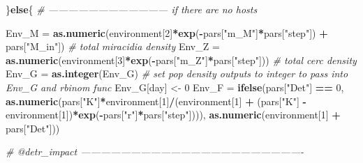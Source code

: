 \documentclass[10,portrait]{article}
\newenvironment{Shaded}{\begin{snugshade}}{\end{snugshade}}
\newcommand{\KeywordTok}[1]{\textcolor[rgb]{0.13,0.29,0.53}{\textbf{#1}}}
\newcommand{\DecValTok}[1]{\textcolor[rgb]{0.00,0.00,0.81}{#1}}
\newcommand{\StringTok}[1]{\textcolor[rgb]{0.31,0.60,0.02}{#1}}
\newcommand{\CommentTok}[1]{\textcolor[rgb]{0.56,0.35,0.01}{\textit{#1}}}
\newcommand{\ControlFlowTok}[1]{\textcolor[rgb]{0.13,0.29,0.53}{\textbf{#1}}}
\newcommand{\OperatorTok}[1]{\textcolor[rgb]{0.81,0.36,0.00}{\textbf{#1}}}
\newcommand{\NormalTok}[1]{#1}
\begin{document}
\begin{Shaded}
\begin{Highlighting}[]
{{{{{{{{{{{\NormalTok{                      \}}\ControlFlowTok{else}\NormalTok{\{ }\CommentTok{# ------------------------------------ if there are no hosts  }
                        
\NormalTok{                        Env_M =}\StringTok{ }\KeywordTok{as.numeric}\NormalTok{(environment[}\DecValTok{2}\NormalTok{]}\OperatorTok{*}\KeywordTok{exp}\NormalTok{(}\OperatorTok{-}\NormalTok{pars[}\StringTok{"m_M"}\NormalTok{]}\OperatorTok{*}\NormalTok{pars[}\StringTok{"step"}\NormalTok{]) }\OperatorTok{+}\StringTok{ }\NormalTok{pars[}\StringTok{"M_in"}\NormalTok{]) }\CommentTok{# total miracidia density }
\NormalTok{                        Env_Z =}\StringTok{ }\KeywordTok{as.numeric}\NormalTok{(environment[}\DecValTok{3}\NormalTok{]}\OperatorTok{*}\KeywordTok{exp}\NormalTok{(}\OperatorTok{-}\NormalTok{pars[}\StringTok{"m_Z"}\NormalTok{]}\OperatorTok{*}\NormalTok{pars[}\StringTok{"step"}\NormalTok{])) }\CommentTok{# total cerc density}
\NormalTok{                        Env_G =}\StringTok{ }\KeywordTok{as.integer}\NormalTok{(Env_G) }\CommentTok{# set pop density outputs to integer to pass into Env_G and rbinom func}
\NormalTok{                        Env_G[day] <-}\StringTok{ }\DecValTok{0}
\NormalTok{                        Env_F =}\StringTok{ }\KeywordTok{ifelse}\NormalTok{(pars[}\StringTok{"Det"}\NormalTok{] }\OperatorTok{==}\StringTok{ }\DecValTok{0}\NormalTok{, }\KeywordTok{as.numeric}\NormalTok{(pars[}\StringTok{"K"}\NormalTok{]}\OperatorTok{*}\NormalTok{environment[}\DecValTok{1}\NormalTok{]}\OperatorTok{/}\NormalTok{(environment[}\DecValTok{1}\NormalTok{] }\OperatorTok{+}\StringTok{ }\NormalTok{(pars[}\StringTok{"K"}\NormalTok{] }\OperatorTok{-}\StringTok{ }\NormalTok{environment[}\DecValTok{1}\NormalTok{])}\OperatorTok{*}\KeywordTok{exp}\NormalTok{(}\OperatorTok{-}\NormalTok{pars[}\StringTok{"r"}\NormalTok{]}\OperatorTok{*}\NormalTok{pars[}\StringTok{"step"}\NormalTok{]))), }\KeywordTok{as.numeric}\NormalTok{(environment[}\DecValTok{1}\NormalTok{] }\OperatorTok{+}\StringTok{ }\NormalTok{pars[}\StringTok{"Det"}\NormalTok{]))}
                        
                        \CommentTok{# @detr_impact -------------------------------------------------------------------}
                        
}}}}}}}}}}}
\end{Highlighting}
\end{Shaded}
\end{document}
